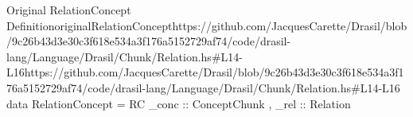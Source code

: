 \begin{haskell}{Original RelationConcept Definition}{originalRelationConcept}{https://github.com/JacquesCarette/Drasil/blob/9c26b43d3e30c3f618e534a3f176a5152729a\newline{}f74/code/drasil-lang/Language/Drasil/Chunk/Relation.hs\#L14-L16}{https://github.com/JacquesCarette/Drasil/blob/9c26b43d3e30c3f618e534a3f176a5152729af74/code/drasil-lang/Language/Drasil/Chunk/Relation.hs\#L14-L16}
data RelationConcept = RC { _conc :: ConceptChunk
                           , _rel :: Relation
                           }
\end{haskell}
